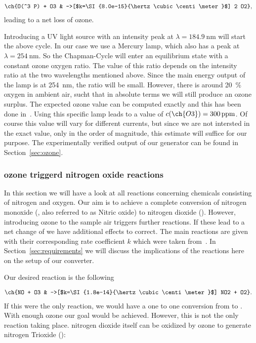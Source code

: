 \begin{align*}
  \ch{O(^3 P) + O3 & ->[$k=\SI{8.0e-15}{\hertz\cubic\centi\meter}$] 2 O2},
\end{align*}
leading to a net loss of ozone. 

Introducing a UV light source with
an intensity peak at $\lambda = \SI{184.9}{\nano\meter}$
will start the above cycle. In our case we use a Mercury lamp, which
also has a peak at $\lambda = \SI{254}{\nano\meter}$. So the
Chapman-Cycle will enter an equilibrium state with a constant ozone
oxygen ratio. The value of this ratio depends on the
intensity ratio at the two wavelengths mentioned above. Since the
main energy output of the lamp is at \SI{254}{\nano\meter}, the ratio
will be small. However, there is around \SI{20}{\%} oxygen in ambient
air, sucht that in absolute terms we will still produce an ozone
surplus. The expected ozone value can be computed exactly and this has been
done in~\cite{bsc}. Using this specific lamp leads to a value of
$c(\ch{O3}) = \SI{300}{ppm}$. Of course this value will vary for
different currents, but since we are not intersted in the exact value,
only in the order of magnitude, this estimate will suffice for our
purpose. The experimentally verified output of our generator can be
found in Section~\ref{sec:ozone}.

\subsubsection{ozone triggerd nitrogen oxide reactions}
\label{sec:o-no}

In this section we will have a look at all reactions concerning
chemicals consisting of nitrogen and oxygen. Our aim is to achieve a
complete conversion of nitrogen monoxide (, also referred to as
Nitric oxide) to nitrogen dioxide (). However, introducing
ozone to the sample air triggers further reactions. If these lead to a
net change of  we have additional effects to correct. The main
reactions are given with their corresponding rate coefficient $k$
which were taken from~\cite{bsc}. In Section~\ref{sec:requirements} we
will discuss the implications of the reactions here on the setup of
our converter.

Our desired reaction is the following

\begin{align}
  \ch{NO + O3 & ->[$k=\SI{1.8e-14}{\hertz\cubic\centi\meter}$] NO2
                + O2}. \label{eq:no}
\end{align}
If this were the only reaction, we would have a one to one conversion
from  to . With enough ozone our goal would be
achieved. However, this is not the only reaction taking
place. nitrogen dioxide itself can be oxidized by ozone to generate
nitrogen Trioxide ():

